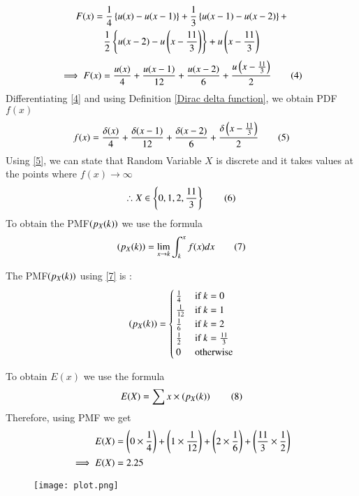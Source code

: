 \documentclass[journal,12pt,twocolumn]{IEEEtran}
\begin{document}
\begin{multline*}
F(x)=\frac{1}{4}\left\{u(x)-u(x-1)\right\}+\frac{1}{3}\left\{u(x-1)-u(x-2)\right\}+\\
\frac{1}{2}\left\{u(x-2)-u\left(x-\frac{11}{3}\right)\right\}+u\left(x-\frac{11}{3}\right)
\end{multline*}
\begin{align*}
\implies F(x)=\frac{u(x)}{4}+\frac{u(x-1)}{12}+\frac{u(x-2)}{6}+\frac{u\left(x-\frac{11}{3}\right)}{2} \tag{4} \label{4}
\end{align*}
Differentiating \eqref{4} and using Definition \ref{Dirac delta function}, we obtain PDF $f(x)$ 
\begin{align*}
f(x)=\frac{\delta(x)}{4}+\frac{\delta(x-1)}{12}+\frac{\delta(x-2)}{6}+\frac{\delta\left(x-\frac{11}{3}\right)}{2} \tag{5} \label{5}
\end{align*}
 Using \eqref{5}, we can state that Random Variable $X$ is discrete and it takes values at the points where $f(x) \to \infty$ \\
\begin{align*}
\therefore X \in \left\{0, 1, 2, \frac{11}{3}\right\} \tag{6} \label{6}
\end{align*}
To obtain the PMF$\left(p_X(k)\right)$ we use the formula
\begin{align*}
\left(p_X(k)\right) = 
\lim_{x\to k}\int_{k}^{x}f(x)dx  
\tag{7} \label{7}
\end{align*}
\begin{definition}
\label{PMF}
 The PMF$\left(p_X(k)\right)$ using \eqref{7} is :
\begin{align*}
\left(p_X(k)\right)=
\begin{cases}
\frac{1}{4} & \text{if } k=0 \\
\frac{1}{12} & \text{if } k=1 \\
\frac{1}{6} & \text{if } k=2 \\
\frac{1}{2} & \text{if } k=\frac{11}{3} \\
0 & \text{otherwise}
\end{cases}
\end{align*}
\end{definition}
To obtain $E(x)$ we use the formula
\begin{align*}
E(X) = \sum  x\times \left(p_X(k)\right) \label{8} \tag{8}
\end{align*}
 Therefore, using PMF we get
\begin{align*}
E(X)& = \left(0\times \frac{1}{4}\right) + \left(1\times \frac{1}{12}\right) + \left(2\times \frac{1}{6}\right) + \left(\frac{11}{3}\times \frac{1}{2}\right) \\
\implies E(X) &= 2.25
\end{align*}
\newpage
\begin{figure}[h!]
    \centering
    \texttt{[image: plot.png]}
    \label{fig:1}
\end{figure}
\end{document}
